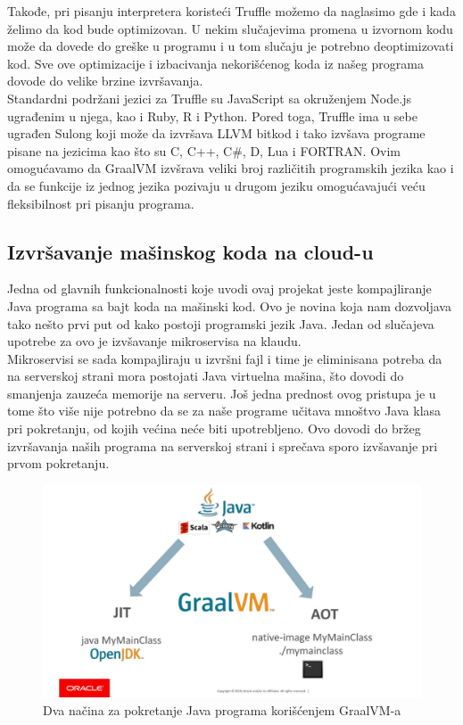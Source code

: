 \documentclass[a4paper]{article}
\begin{document}
 Takođe, pri pisanju interpretera koristeći Truffle možemo da naglasimo gde i kada želimo da kod bude optimizovan. U nekim slučajevima promena u izvornom kodu može da dovede do greške u programu i u tom slučaju je potrebno deoptimizovati kod. Sve ove optimizacije i izbacivanja nekorišćenog koda iz našeg programa dovode do velike brzine izvršavanja. \\

Standardni podržani jezici za Truffle su JavaScript sa okruženjem Node.js ugrađenim u njega, kao i Ruby, R i Python. Pored toga, Truffle ima u sebe ugrađen Sulong koji može da izvršava LLVM bitkod i tako izvšava programe pisane na jezicima kao što su C, C++, C\#, D, Lua i FORTRAN. Ovim omogućavamo da GraalVM izvšrava veliki broj različitih programskih jezika kao i da se funkcije iz jednog jezika pozivaju u drugom jeziku omogućavajući veću fleksibilnost pri pisanju programa.

\subsection{Izvršavanje mašinskog koda na cloud-u}
\label{sub:Izvršavanje mašinskog koda na cloud-u}

Jedna od glavnih funkcionalnosti koje uvodi ovaj projekat jeste kompajliranje Java programa sa bajt koda na mašinski kod. Ovo je novina koja nam dozvoljava tako nešto prvi put od kako postoji programski jezik Java. Jedan od slučajeva upotrebe za ovo je izvšavanje mikroservisa na klaudu. \\

Mikroservisi se sada kompajliraju u izvršni fajl i time je eliminisana potreba da na serverskoj strani mora postojati Java virtuelna mašina, što dovodi do smanjenja zauzeća memorije na serveru. Još jedna prednost ovog pristupa je u tome što više nije potrebno da se za naše programe učitava mnoštvo Java klasa pri pokretanju, od kojih većina neće biti upotrebljeno. Ovo dovodi do bržeg izvršavanja naših programa na serverskoj strani i sprečava sporo izvšavanje pri prvom pokretanju. 


\begin{figure}
	\begin{center}
	\includegraphics[scale=0.25]{imgs/run_java.jpg}
	\end{center}
	\caption{Dva načina za pokretanje Java programa korišćenjem GraalVM-a}
	\label{fig:run java}
\end{figure}
\end{document}
